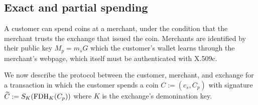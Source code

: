 \documentclass{llncs}
\begin{document}
\subsection{Exact and partial spending}

A customer can spend coins at a merchant, under the condition that the
merchant trusts the exchange that issued the coin.
Merchants are identified by their public key $M_p = m_s G$ which the
customer's wallet learns through the merchant's webpage, which itself
must be authenticated with X.509c.

We now describe the protocol between the customer, merchant, and exchange
for a transaction in which the customer spends a coin $C := (c_s, C_p)$
with signature $\widetilde{C} := S_K(\textrm{FDH}_K(C_p))$
 where $K$ is the exchange's demonination key.

\end{document}
